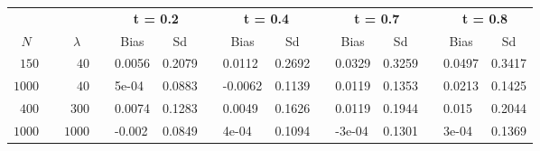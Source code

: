 \begin{table}[!tbp]
\begin{center}
\begin{tabular}{rcrcllcllcllcll}
\hline\hline
\multicolumn{1}{c}{\bfseries }&\multicolumn{1}{c}{\bfseries }&\multicolumn{1}{c}{\bfseries }&\multicolumn{1}{c}{\bfseries }&\multicolumn{2}{c}{\bfseries t = 0.2}&\multicolumn{1}{c}{\bfseries }&\multicolumn{2}{c}{\bfseries t = 0.4}&\multicolumn{1}{c}{\bfseries }&\multicolumn{2}{c}{\bfseries t = 0.7}&\multicolumn{1}{c}{\bfseries }&\multicolumn{2}{c}{\bfseries t = 0.8}\tabularnewline
\cline{5-6} \cline{8-9} \cline{11-12} \cline{14-15}
\multicolumn{1}{c}{$N$}&\multicolumn{1}{c}{}&\multicolumn{1}{c}{$\lambda$}&\multicolumn{1}{c}{}&\multicolumn{1}{c}{Bias}&\multicolumn{1}{c}{Sd}&\multicolumn{1}{c}{}&\multicolumn{1}{c}{Bias}&\multicolumn{1}{c}{Sd}&\multicolumn{1}{c}{}&\multicolumn{1}{c}{Bias}&\multicolumn{1}{c}{Sd}&\multicolumn{1}{c}{}&\multicolumn{1}{c}{Bias}&\multicolumn{1}{c}{Sd}\tabularnewline
\hline
$ 150$&&$  40$&&0.0056&0.2079&&0.0112&0.2692&&0.0329&0.3259&&0.0497&0.3417\tabularnewline
$1000$&&$  40$&&5e-04&0.0883&&-0.0062&0.1139&&0.0119&0.1353&&0.0213&0.1425\tabularnewline
$ 400$&&$ 300$&&0.0074&0.1283&&0.0049&0.1626&&0.0119&0.1944&&0.015&0.2044\tabularnewline
$1000$&&$1000$&&-0.002&0.0849&&4e-04&0.1094&&-3e-04&0.1301&&3e-04&0.1369\tabularnewline
\hline
\end{tabular}\end{center}
\end{table}
